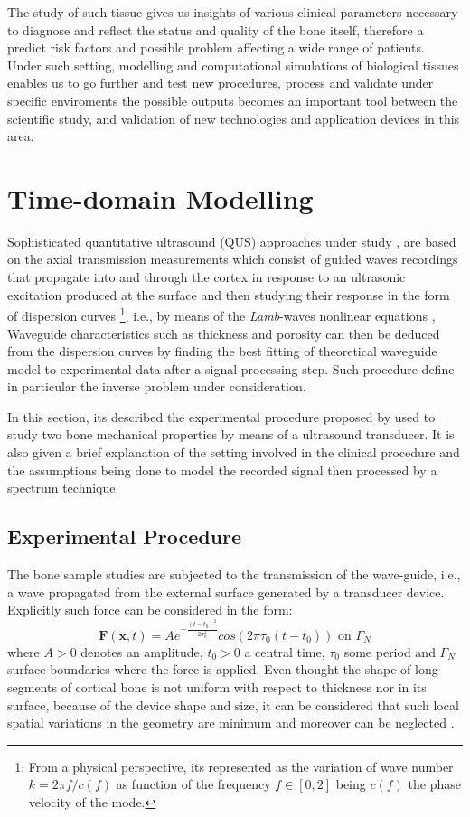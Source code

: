 The study of such tissue gives us insights of various clinical parameters necessary to diagnose and reflect the status and quality of the bone itself, therefore a predict risk factors and possible problem affecting a wide range of patients. Under such setting, modelling and computational simulations of biological tissues enables us to go further and test new procedures, process and validate under specific enviroments the possible outputs becomes an important tool between the scientific study, and validation of new technologies and application devices in this area.

\section{Time-domain Modelling}

Sophisticated quantitative ultrasound (QUS) approaches under study \cite{Foiret2014} \cite{Minonzio2018}, are based on the axial transmission measurements which consist of guided waves recordings that propagate into and through the cortex in response to an ultrasonic excitation produced at the surface and then studying their response in the form of dispersion curves \footnote{From a physical perspective, its represented as the variation of wave number $k = 2 \pi f/c(f)$ as function of the frequency $f \in [0, 2]$ being $c(f)$ the phase velocity of the mode.}, i.e., by means of the \textit{Lamb}-waves nonlinear equations \cite{Rhee2007},
Waveguide characteristics such as thickness and porosity can then be deduced from the dispersion curves by finding the best fitting of theoretical waveguide model to experimental data after a signal processing step. Such procedure define in particular the inverse problem under consideration.

In this section, its described the experimental procedure proposed by \cite{Minonzio2018} used to study two bone mechanical properties by means of a ultrasound transducer.
It is also given a brief explanation of the setting involved in the clinical procedure and the assumptions being done to model the recorded signal then processed by a spectrum technique. 

\subsection{Experimental Procedure}
The bone sample studies are subjected to the transmission of the wave-guide, i.e., a wave propagated from the external surface generated by a transducer device. 
Explicitly such force can be considered in the form:
\begin{equation*}
    \mathbf{F}(\mathbf{x},t) = A e^{-\frac{(t-t_0)^2}{2\sigma_0^2}} cos(2 \pi \tau_0 (t-t_0)) \text{ on } \Gamma_N
\end{equation*}
where $A > 0$ denotes an amplitude, $t_0 > 0$ a central time, $\tau_0$ some period and $\Gamma_N$ surface boundaries where the force is applied.
Even thought the shape of long segments of cortical bone is not uniform with respect to thickness nor in its surface, because of the device shape and size, it can be considered that such local spatial variations in the geometry are minimum and moreover can be neglected \cite{Foiret2014}. \\

